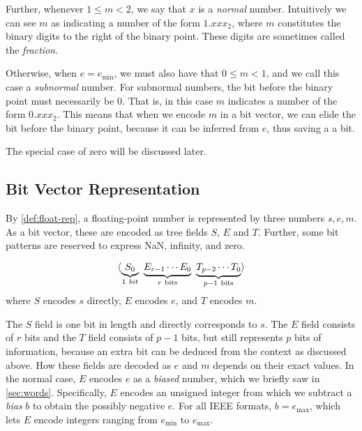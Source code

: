 Further, whenever $1 \leq m < 2$, we say that $x$ is a \emph{normal}
number.  Intuitively we can see $m$ as indicating a number of the form
$1.xxx_{2}$, where $m$ constitutes the binary digits to the right of
the binary point.  These digits are sometimes called the
\emph{fraction}.

Otherwise, when $e=e_{\text{min}}$, we must also have that
$0 \leq m < 1$, and we call this case a \emph{subnormal} number.  For
subnormal numbers, the bit before the binary point must necessarily be
0.  That is, in this case $m$ indicates a number of the form
$0.xxx_{2}$.  This means that when we encode $m$ in a bit vector, we
can elide the bit before the binary point, because it can be inferred
from $e$, thus saving a a bit.

The special case of zero will be discussed later.

\subsection{Bit Vector Representation}
\label{sec:float-bits}

By \cref{def:float-rep}, a floating-point number is represented by
three numbers $s,e,m$.  As a bit vector, these are encoded as tree
fields $S$, $E$ and $T$.  Further, some bit patterns are reserved to
express NaN, infinity, and zero.

\begin{definition}
  \[
    \langle \underbrace{S_{0}}_{1~bit}~\underbrace{E_{r-1}\cdots{E_{0}}}_{r~\text{bits}}~\underbrace{T_{p-2}\cdots{}T_{0}}_{p-1~\text{bits}} \rangle
  \]
  where $S$ encodes $s$ directly, $E$ encodes $e$, and $T$ encodes
  $m$.
  \label{def:float-fields}
\end{definition}

The $S$ field is one bit in length and directly corresponds to $s$.
The $E$ field consists of $r$ bits and the $T$ field consists of
$p-1$ bits, but still represents $p$ bits of information, because an
extra bit can be deduced from the context as discussed above. How
these fields are decoded as $e$ and $m$ depends on their exact values.
In the normal case, $E$ encodes $e$ as a \emph{biased} number, which
we briefly saw in \cref{sec:words}.  Specifically, $E$ encodes an
unsigned integer from which we subtract a \emph{bias} $b$ to obtain
the possibly negative $e$.  For all IEEE formats, $b=e_{\text{max}}$,
which lets $E$ encode integers ranging from $e_{\text{min}}$ to
$e_{\text{max}}$.


